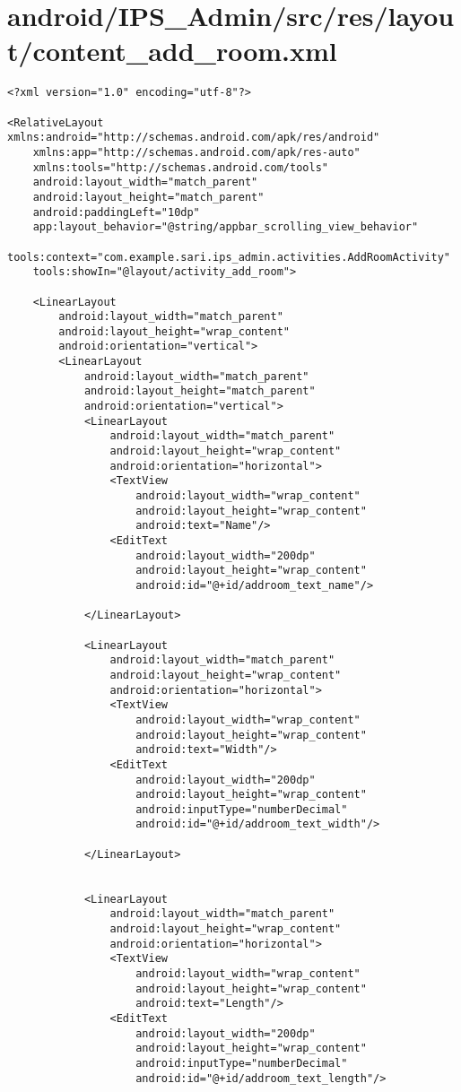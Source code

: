 \section{android/IPS\_Admin/src/res/layout/content\_add\_room.xml}
\begin{lstlisting}<?xml version="1.0" encoding="utf-8"?>

<RelativeLayout xmlns:android="http://schemas.android.com/apk/res/android"
    xmlns:app="http://schemas.android.com/apk/res-auto"
    xmlns:tools="http://schemas.android.com/tools"
    android:layout_width="match_parent"
    android:layout_height="match_parent"
    android:paddingLeft="10dp"
    app:layout_behavior="@string/appbar_scrolling_view_behavior"
    tools:context="com.example.sari.ips_admin.activities.AddRoomActivity"
    tools:showIn="@layout/activity_add_room">

    <LinearLayout
        android:layout_width="match_parent"
        android:layout_height="wrap_content"
        android:orientation="vertical">
        <LinearLayout
            android:layout_width="match_parent"
            android:layout_height="match_parent"
            android:orientation="vertical">
            <LinearLayout
                android:layout_width="match_parent"
                android:layout_height="wrap_content"
                android:orientation="horizontal">
                <TextView
                    android:layout_width="wrap_content"
                    android:layout_height="wrap_content"
                    android:text="Name"/>
                <EditText
                    android:layout_width="200dp"
                    android:layout_height="wrap_content"
                    android:id="@+id/addroom_text_name"/>

            </LinearLayout>

            <LinearLayout
                android:layout_width="match_parent"
                android:layout_height="wrap_content"
                android:orientation="horizontal">
                <TextView
                    android:layout_width="wrap_content"
                    android:layout_height="wrap_content"
                    android:text="Width"/>
                <EditText
                    android:layout_width="200dp"
                    android:layout_height="wrap_content"
                    android:inputType="numberDecimal"
                    android:id="@+id/addroom_text_width"/>

            </LinearLayout>


            <LinearLayout
                android:layout_width="match_parent"
                android:layout_height="wrap_content"
                android:orientation="horizontal">
                <TextView
                    android:layout_width="wrap_content"
                    android:layout_height="wrap_content"
                    android:text="Length"/>
                <EditText
                    android:layout_width="200dp"
                    android:layout_height="wrap_content"
                    android:inputType="numberDecimal"
                    android:id="@+id/addroom_text_length"/>



\end{lstlisting}
